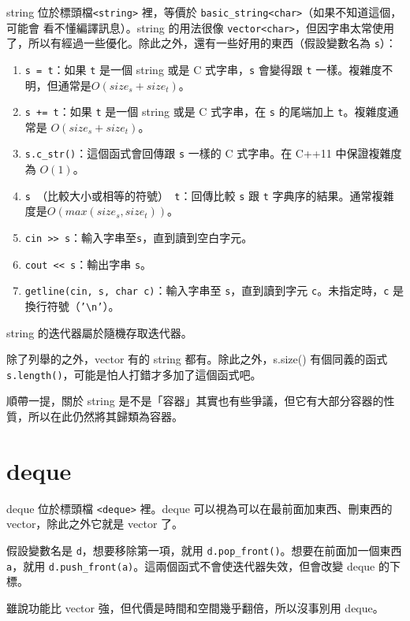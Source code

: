 \documentclass[a4paper, 11pt, oneside]{book}
\begin{document}
string 位於標頭檔\texttt{<string>} 裡，等價於 \texttt{basic\_string<char>}（如果不知道這個，可能會
看不懂編譯訊息）。string 的用法很像 \texttt{vector<char>}，但因字串太常使用了，所以有經過一些優化。除此之外，還有一些好用的東西（假設變數名為 \texttt{s}）：

\begin{enumerate}
    \item \texttt{s = t}：如果 \texttt{t} 是一個 string 或是 C 式字串，\texttt{s} 會變得跟 \texttt{t} 一樣。複雜度不明，但通常是$O(size_s + size_t)$。
    \item \texttt{s += t}：如果 \texttt{t} 是一個 string 或是 C 式字串，在 \texttt{s} 的尾端加上 \texttt{t}。複雜度通常是 $O(size_s+size_t)$。
    \item \texttt{s.c\_str()}：這個函式會回傳跟 \texttt{s} 一樣的 C 式字串。在 C++11 中保證複雜度為 $O(1)$。
    \item \texttt{s }（比較大小或相等的符號）\texttt{ t}：回傳比較 \texttt{s} 跟 \texttt{t} 字典序的結果。通常複雜度是$O(max(size_s, size_t))$。
    \item \texttt{cin >> s}：輸入字串至\texttt{s}，直到讀到空白字元。
    \item \texttt{cout << s}：輸出字串 \texttt{s}。
          \item\texttt{getline(cin, s, char c)}：輸入字串至 \texttt{s}，直到讀到字元 \texttt{c}。未指定時，\texttt{c} 是換行符號（\texttt{'\textbackslash n'}）。
\end{enumerate}

string 的迭代器屬於隨機存取迭代器。

除了列舉的之外，vector 有的 string 都有。除此之外，s.size() 有個同義的函式\texttt{s.length()}，可能是怕人打錯才多加了這個函式吧。

順帶一提，關於 string 是不是「容器」其實也有些爭議，但它有大部分容器的性質，所以在此仍然將其歸類為容器。

\section{deque}

deque 位於標頭檔 \texttt{<deque>} 裡。deque 可以視為可以在最前面加東西、刪東西的vector，除此之外它就是 vector 了。

假設變數名是 \texttt{d}，想要移除第一項，就用 \texttt{d.pop\_front()}。想要在前面加一個東西 \texttt{a}，就用 \texttt{d.push\_front(a)}。這兩個函式不會使迭代器失效，但會改變 deque 的下標。

雖說功能比 vector 強，但代價是時間和空間幾乎翻倍，所以沒事別用 deque。
\end{document}
